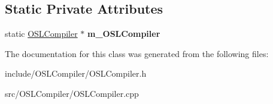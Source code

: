 \subsection*{Static Private Attributes}
\begin{DoxyCompactItemize}
\item 
\hypertarget{class_o_s_l_compiler_a85c4ad71fb7c6e6a25a093663f98fed4}{static \hyperlink{class_o_s_l_compiler}{O\-S\-L\-Compiler} $\ast$ {\bfseries m\-\_\-\-O\-S\-L\-Compiler}}\label{class_o_s_l_compiler_a85c4ad71fb7c6e6a25a093663f98fed4}

\end{DoxyCompactItemize}


The documentation for this class was generated from the following files\-:\begin{DoxyCompactItemize}
\item 
include/\-O\-S\-L\-Compiler/O\-S\-L\-Compiler.\-h\item 
src/\-O\-S\-L\-Compiler/O\-S\-L\-Compiler.\-cpp\end{DoxyCompactItemize}
